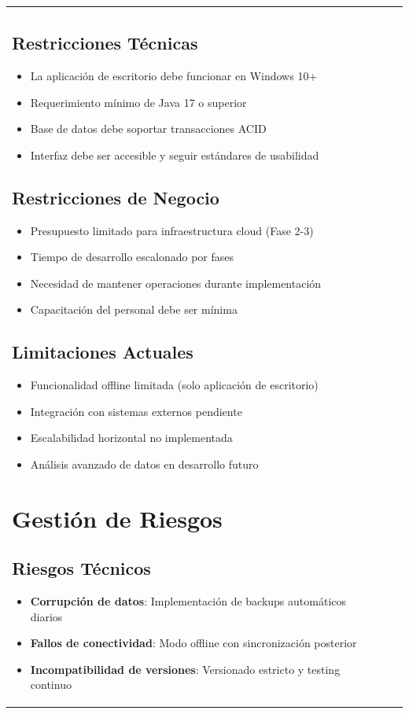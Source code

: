 \documentclass[12pt,letterpaper]{article}
\begin{document}
\begin{longtable}{|p{3cm}|p{2cm}|p{4cm}|p{6cm}|}
\subsection{Restricciones Técnicas}
\begin{itemize}
    \item La aplicación de escritorio debe funcionar en Windows 10+
    \item Requerimiento mínimo de Java 17 o superior
    \item Base de datos debe soportar transacciones ACID
    \item Interfaz debe ser accesible y seguir estándares de usabilidad
\end{itemize}

\subsection{Restricciones de Negocio}
\begin{itemize}
    \item Presupuesto limitado para infraestructura cloud (Fase 2-3)
    \item Tiempo de desarrollo escalonado por fases
    \item Necesidad de mantener operaciones durante implementación
    \item Capacitación del personal debe ser mínima
\end{itemize}

\subsection{Limitaciones Actuales}
\begin{itemize}
    \item Funcionalidad offline limitada (solo aplicación de escritorio)
    \item Integración con sistemas externos pendiente
    \item Escalabilidad horizontal no implementada
    \item Análisis avanzado de datos en desarrollo futuro
\end{itemize}

\section{Gestión de Riesgos}

\subsection{Riesgos Técnicos}
\begin{itemize}
    \item \textbf{Corrupción de datos}: Implementación de backups automáticos diarios
    \item \textbf{Fallos de conectividad}: Modo offline con sincronización posterior
    \item \textbf{Incompatibilidad de versiones}: Versionado estricto y testing continuo
\end{itemize}


\end{longtable}
\end{document}
